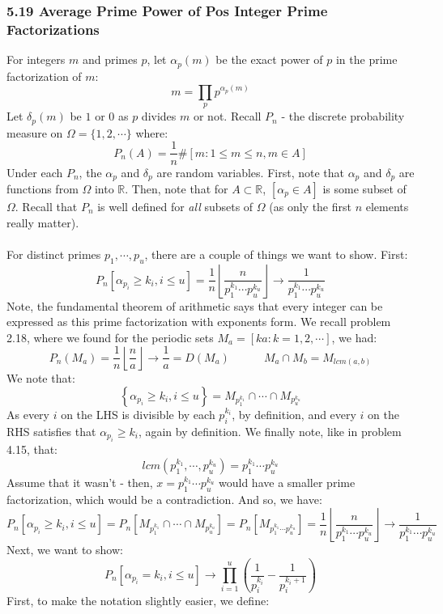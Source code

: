 \documentclass[12pt,a4paper]{article}
\newcommand{\1}[1]{\mathbbm{1}\left\{ #1 \right\}}
\newcommand{\R}{\mathbb{R}}
\newcommand{\floor}[1]{\left\lfloor #1 \right\rfloor}
\begin{document}
\subsubsection{5.19 Average Prime Power of Pos Integer Prime Factorizations} For integers $m$ and primes $p$, let $\alpha_p(m)$ be the exact power of $p$ in the prime factorization of $m$:
$$
	m = \prod_p p^{\alpha_p(m)}
$$
Let $\delta_p(m)$ be $1$ or $0$ as $p$ divides $m$ or not. Recall $P_n$ - the discrete probability measure on $\Omega = \{1, 2, \cdots\}$ where:
$$
	P_n(A) = \frac{1}{n}\#\left[m : 1 \leq m \leq n, m \in A\right]
$$
Under each $P_n$, the $\alpha_p$ and $\delta_p$ are random variables. First, note that $\alpha_p$ and $\delta_p$ are functions from $\Omega$ into $\R$. Then, note that for $A \subset \R$, $[\alpha_p \in A]$ is some subset of $\Omega$. Recall that $P_n$ is well defined for \textit{all} subsets of $\Omega$ (as only the first $n$ elements really matter). 
\\\\
For distinct primes $p_1, \cdots, p_u$, there are a couple of things we want to show. First:
$$
	P_n[\alpha_{p_i} \geq k_i, i \leq u] = \frac{1}{n}\floor{\frac{n}{p_1^{k_1} \cdots p_u^{k_u}}} \to 
	\frac{1}{p_1^{k_1} \cdots p_u^{k_u}}
$$
Note, the fundamental theorem of arithmetic says that every integer can be expressed as this prime factorization with exponents form. We recall problem 2.18, where we found for the periodic sets $M_a = [ka: k = 1, 2, \cdots]$, we had:
$$
	P_n(M_a) = \frac{1}{n}\floor{\frac{n}{a}} \to \frac{1}{a} = D(M_a)
	\quad\quad\quad
	M_a \cap M_b = M_{lcm(a,b)}
$$
We note that:
$$
	\left\{\alpha_{p_i} \geq k_i, i \leq u\right\} = M_{p_1^{k_1}} \cap \cdots \cap M_{p_u^{k_u}}
$$
As every $i$ on the LHS is divisible by each $p_i^{k_i}$, by definition, and every $i$ on the RHS satisfies that $\alpha_{p_i} \geq k_i$, again by definition. We finally note, like in problem 4.15, that:
$$
	lcm(p_1^{k_1}, \cdots, p_u^{k_u}) = p_1^{k_1} \cdots p_u^{k_u}
$$
Assume that it wasn't - then, $x = p_1^{k_1} \cdots p_u^{k_u}$ would have a smaller prime factorization, which would be a contradiction. And so, we have:
$$
	P_n[\alpha_{p_i} \geq k_i, i \leq u] = P_n\left[M_{p_1^{k_1}} \cap \cdots \cap M_{p_u^{k_u}}\right] =
	P_n\left[M_{p_1^{k_1} \cdots p_u^{k_u}}\right] =
	\frac{1}{n}\floor{\frac{n}{p_1^{k_1} \cdots p_u^{k_u}}} \to 
	\frac{1}{p_1^{k_1} \cdots p_u^{k_u}}
$$
Next, we want to show:
$$
	P_n\left[\alpha_{p_i} = k_i, i \leq u\right] \to \prod_{i=1}^u \left(\frac{1}{p_i^{k_i}} - \frac{1}{p_i^{k_i+1}}\right)
$$
First, to make the notation slightly easier, we define:
\end{document}
